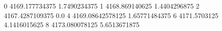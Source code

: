 0 4169.177734375 1.7490234375
1 4168.869140625 1.4404296875
2 4167.4287109375 0.0
4 4169.08642578125 1.65771484375
6 4171.5703125 4.1416015625
8 4173.080078125 5.6513671875
